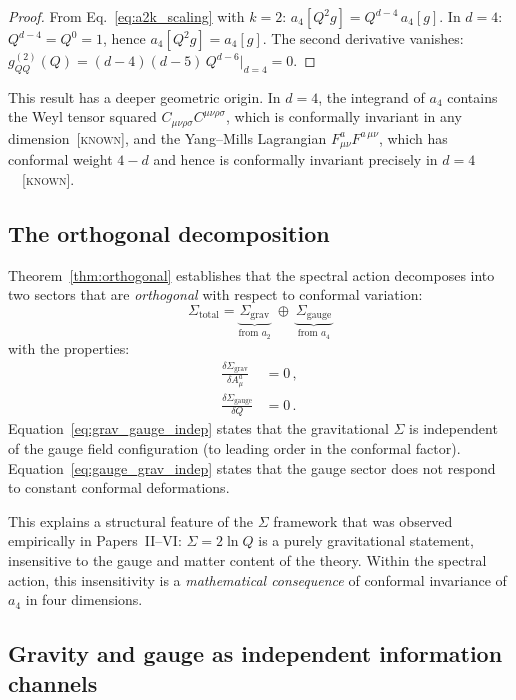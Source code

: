 \documentclass[prd,twocolumn,superscriptaddress,longbibliography]{revtex4-2}
\newcommand{\Sgrav}{\Sigma_{\mathrm{grav}}}
\newcommand{\Sgauge}{\Sigma_{\mathrm{gauge}}}
\newcommand{\Stot}{\Sigma_{\mathrm{total}}}
\newcommand{\known}{\textsc{[known]}}
\begin{document}
\begin{proof}
From Eq.~\eqref{eq:a2k_scaling} with $k=2$:
$a_4[Q^2g] = Q^{d-4}\,a_4[g]$.
In $d=4$: $Q^{d-4}=Q^0=1$, hence
$a_4[Q^2g]=a_4[g]$.
The second derivative vanishes:
$g_{QQ}^{(2)}(Q) = (d-4)(d-5)\,Q^{d-6}\big|_{d=4}=0$.
\end{proof}

This result has a deeper geometric origin.
In $d=4$, the integrand of $a_4$ contains the
Weyl tensor squared $C_{\mu\nu\rho\sigma}C^{\mu\nu\rho\sigma}$,
which is conformally invariant in any dimension~\known,
and the Yang--Mills Lagrangian
$F_{\mu\nu}^a F^{a\,\mu\nu}$, which has conformal weight
$4-d$ and hence is conformally invariant precisely in
$d=4$~\cite{Wald1984}~\known.

\subsection{The orthogonal decomposition}

Theorem~\ref{thm:orthogonal} establishes that the spectral
action decomposes into two sectors that are \emph{orthogonal}
with respect to conformal variation:
\begin{equation}\label{eq:decomposition}
  \boxed{\;
  \Stot
  = \underbrace{\Sgrav}_{\text{from }a_2}
  \;\oplus\;
  \underbrace{\Sgauge}_{\text{from }a_4}
  \;}
\end{equation}
with the properties:
\begin{align}
  \frac{\delta\Sgrav}{\delta A_\mu^a} &= 0\,,
  \label{eq:grav_gauge_indep}\\
  \frac{\delta\Sgauge}{\delta Q} &= 0\,.
  \label{eq:gauge_grav_indep}
\end{align}
Equation~\eqref{eq:grav_gauge_indep} states that the
gravitational $\Sigma$ is independent of the gauge
field configuration (to leading order in the conformal
factor).
Equation~\eqref{eq:gauge_grav_indep} states that the gauge
sector does not respond to constant conformal deformations.

This explains a structural feature of the $\Sigma$ framework
that was observed empirically in Papers~II--VI:
$\Sigma = 2\ln Q$ is a purely gravitational
statement, insensitive to the gauge and matter
content of the theory.
Within the spectral action, this insensitivity is a
\emph{mathematical consequence} of conformal invariance
of $a_4$ in four dimensions.

\subsection{Gravity and gauge as independent information channels}
\end{document}
